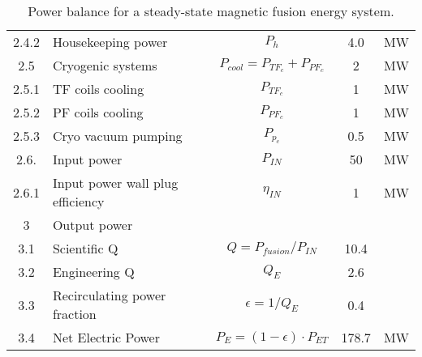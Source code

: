 \begin{table}[ht!]
\begin{tabular}{|c|p{5cm}|c|c|c|}
2.4.2	&	Housekeeping power	&	$P_{{h}}$	&	4.0	&	MW \\
2.5	&	Cryogenic systems	&	$P_{{cool}} = P_{{TF}_c} + P_{{PF}_c}$	&	2	&	MW \\
2.5.1	&	TF coils cooling	&	$P_{{TF}_c}$	&	1	&	MW \\
2.5.2	&	PF coils cooling	&	$P_{{PF}_c}$	&	1	&	MW \\
2.5.3	&	Cryo vacuum pumping	&	$P_{{p}_c}$	&	0.5	&	MW \\
2.6.	& Input power 	& $P_{IN}$	&	50	&	MW \\
2.6.1	& Input power wall plug efficiency  &	$\eta_{IN}$ & 1	&	MW \\
\hline								
3	&	Output power	&		&		&	\\
\hline
3.1	&	Scientific Q	&	$Q = P_{{fusion}}/P_{{IN}}$	&	10.4	&	\\
3.2	&	Engineering Q	&	$Q_{{E}}$	&	2.6	&	\\
3.3	&	Recirculating power fraction	&	$\epsilon = 1/Q_{{E}}$	&	0.4	&	\\
3.4	&	Net Electric Power	&	$P_{{E}} = (1 - \epsilon) \cdot P_{{ET}}$	&	178.7	&	MW \\
\hline								
\end{tabular}	
\caption{Power balance for a steady-state magnetic fusion energy system.}
\label{tab:powerbalance}
\end{table}





